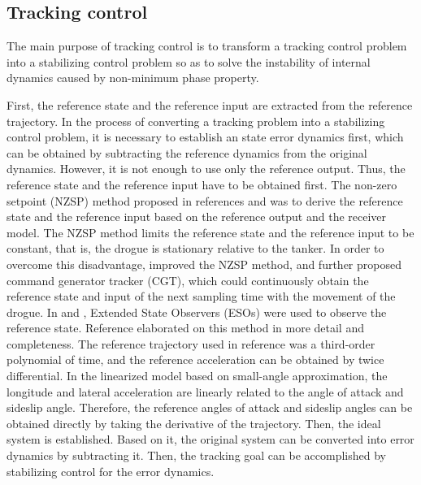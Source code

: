 \subsection{Tracking control}

The main purpose of tracking control is to transform a tracking control
problem into a stabilizing control problem so as to solve the instability
of internal dynamics caused by non-minimum phase property. 

First, the reference state and the reference input are extracted from
the reference trajectory. In the process of converting a tracking
problem into a stabilizing control problem, it is necessary to establish
an state error dynamics first, which can be obtained by subtracting
the reference dynamics from the original dynamics. However, it is
not enough to use only the reference output. Thus, the reference state
and the reference input have to be obtained first. The non-zero setpoint
(NZSP) method proposed in references \cite{valasek2002vision} and
\cite{kimmett2002autonomous} was to derive the reference state and
the reference input based on the reference output and the receiver
model. The NZSP method limits the reference state and the reference
input to be constant, that is, the drogue is stationary relative to
the tanker. In order to overcome this disadvantage, \cite{kimmett2002vision}
improved the NZSP method, and further proposed command generator tracker
(CGT), which could continuously obtain the reference state and input
of the next sampling time with the movement of the drogue. In \cite{tandale2006trajectory}
and \cite{liu2011flight}, Extended State Observers (ESOs) were used
to observe the reference state. Reference \cite{liu2012research}
elaborated on this method in more detail and completeness. The reference
trajectory used in reference \cite{fravolini2004modeling} was a third-order
polynomial of time, and the reference acceleration can be obtained
by twice differential. In the linearized model based on small-angle
approximation, the longitude and lateral acceleration are linearly
related to the angle of attack and sideslip angle. Therefore, the
reference angles of attack and sideslip angles can be obtained directly
by taking the derivative of the trajectory. Then, the ideal system
is established. Based on it, the original system can be converted
into error dynamics by subtracting it. Then, the tracking goal can
be accomplished by stabilizing control for the error dynamics.

